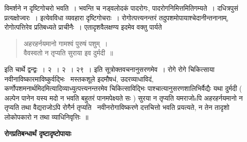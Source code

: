 \documentclass[11pt, openany]{book}
\begin{document}
\newpage

\noindent
विमर्शने न दृष्टिगोचरो भवति~। भवन्ति च {\qt नड्वलोदकं पादरोगः, पादरोगनिमित्तमितिगम्यते~। दधित्रपुसं प्रत्यक्षोज्वरः~। } इत्येवविधा व्यवहारा दृष्टिगोचराः~। रोगोत्पत्त्यनन्तरं तदुपशमोपायाश्चेदानीन्तनानाम्, रोगोत्पत्तिरेव प्रतिबध्यते प्राचीनैः~। एतादृशवैलक्षण्य इदमेव वक्तु पार्यते \textendash\

\begin{quote}
{\qt अहरहर्नयमानो गामश्वं पुरुषं पशुम्~।\\
वैवस्वतो न तृप्यति सुराया इव दुर्मदी~॥}
\end{quote}

इति चार्थे द्वन्द्वः~। २~। २~। २९~। इति सूत्रोक्तवचनानुसरणमेव~। रोगे रोगे चिकित्साया नवीनाविष्कारमाविष्कुर्वद्भिः \textendash\ मस्तकशूले इदमौषधं, उदरव्याधाविदं, कर्णोपशमनार्थमिदमित्यादिव्याध्युत्पत्त्यनन्तरमेव चिकित्साविद्भिः पाश्चात्यानुसरणशालिभिर्वैद्यैः {\qt यथा दुर्मदी ( अल्पेन पानेन यस्य मदो न भवति बहुतरं पानमपेक्ष्यते सः ) सुरया न तृप्यति यमराजोsपि अहरहर्नयमानो न तृप्यति तथा वैद्यराजोऽपि रोगैर्न तृप्यति \textendash\ नवीनरोगाविष्करणे दत्तचित्तो भवति} प्रयत्यते, न तेन तादृशो लोकोपकारो न तथा व्याधिनिवृत्तिः~॥

\begin{center}
\textbf{\Large रोगप्रतिबन्धार्थं दृष्टादृष्टोपायाः \textendash\ }
\end{center}
\end{document}
